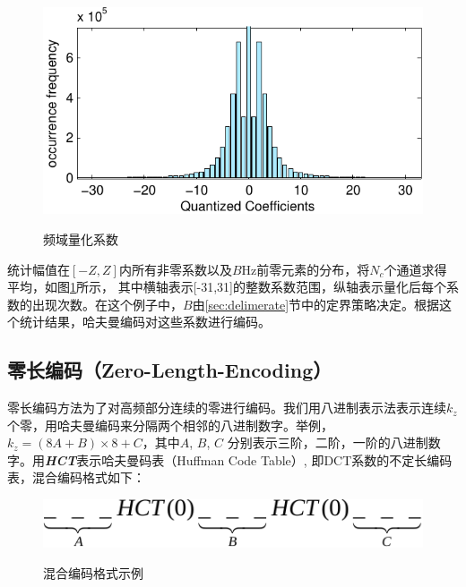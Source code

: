 \begin{figure}
  \centering
  \includegraphics{Pictures/Compression/f5-crop.pdf}\\
  \caption{频域量化系数}\label{fig:Quantized Coefficient Distribution}
\end{figure}


统计幅值在$[-Z,Z]$内所有非零系数以及$B$Hz前零元素的分布，将$N_c$个通道求得平均，如图\ref{fig:Quantized Coefficient Distribution}所示， 其中横轴表示[-31,31]的整数系数范围，纵轴表示量化后每个系数的出现次数。在这个例子中，$B$由\ref{sec:delimerate}节中的定界策略决定。根据这个统计结果，哈夫曼编码对这些系数进行编码。



\subsection{零长编码（Zero-Length-Encoding）}
\label{Zero-Length-Encoding}

零长编码方法为了对高频部分连续的零进行编码。我们用八进制表示法表示连续$k_z$个零，用哈夫曼编码来分隔两个相邻的八进制数字。举例，$k_z=(8A+B)\times 8+C$，其中$A$, $B$, $C$ 分别表示三阶，二阶，一阶的八进制数字。用\textbf{\emph{HCT}}表示哈夫曼码表（Huffman Code Table）, 即DCT系数的不定长编码表，混合编码格式如下：

\begin{figure}[H]
  \centering
  \includegraphics{Pictures/Compression/HCT-crop.pdf}\\
  \caption{混合编码格式示例}
\end{figure}

